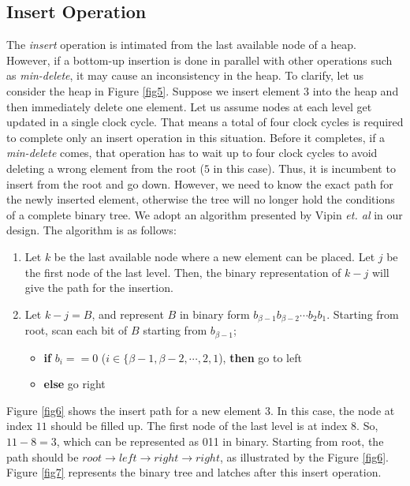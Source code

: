 \subsection{Insert Operation}

The {\it insert} operation is intimated from the last available node of a heap.
However, if a bottom-up insertion is done in parallel with other operations such as {\it min-delete}, it may cause an inconsistency in the heap.
To clarify, let us consider the heap in Figure \ref{fig5}.
Suppose we insert element $3$ into the heap and then immediately delete one element.
Let us assume nodes at each level get updated in a single clock cycle.
That means a total of four clock cycles is required to complete only an insert operation in this situation.
Before it completes, if a {\it min-delete} comes, that operation has to wait up to four clock cycles to avoid deleting a wrong element from the root ($5$ in this case).
Thus, it is incumbent to insert from the root and go down.
However, we need to know the exact path for the newly inserted element, otherwise the tree will no longer hold the conditions of a complete binary tree.
We adopt an algorithm presented by Vipin {\it et. al} \cite{pq6} in our design. The algorithm is as follows:

\begin{enumerate}
\item Let $k$ be the last available node where a new element can be placed. Let $j$ be the first node of the last level. Then, the binary representation of $k-j$ will give the path for the insertion.
\item Let $k-j = B$, and represent $B$ in binary form $b_{\beta-1}b_{\beta-2} \cdots b_2b_1$. Starting from root, scan each bit of $B$ starting from $b_{\beta-1}$;
    \begin{itemize}
    \item {\bf if} $b_i == 0$ ($i \in \{\beta-1,\beta-2, \cdots, 2,1$), {\bf then} go to left
    \item {\bf else} go right
    \end{itemize}
\end{enumerate}

Figure \ref{fig6} shows the insert path for a new element $3$. In this case, the node at index $11$ should be filled up.
The first node of the last level is at index $8$.
So, $11 - 8 = 3$, which can be represented as 011 in binary.
Starting from root, the path should be $root \rightarrow left \rightarrow right \rightarrow right$, as illustrated by the Figure \ref{fig6}. Figure \ref{fig7} represents the binary tree and latches after this insert operation.

